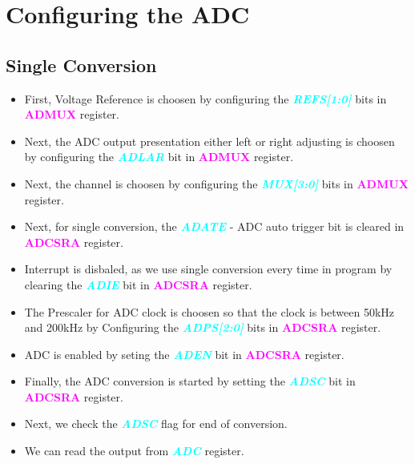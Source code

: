 \documentclass{article}
\newcommand{\bitFormat}[1]{\emph{\textbf{\textcolor{cyan}{#1}}}}
\newcommand{\regFormat}[1]{\textbf{\textcolor{magenta}{#1}}}
\begin{document}
\section{Configuring the ADC}
\subsection{Single Conversion}
\begin{itemize}
    \item First, Voltage Reference is choosen by configuring the \bitFormat{REFS[1:0]} bits in \regFormat{ADMUX} register.
    \item Next, the ADC output presentation either left or right adjusting is choosen by configuring the \bitFormat{ADLAR} bit in \regFormat{ADMUX} register.
    \item Next, the channel is choosen by configuring the \bitFormat{MUX[3:0]} bits in \regFormat{ADMUX} register.
    \item Next, for single conversion, the \bitFormat{ADATE} - ADC auto trigger bit is cleared in \regFormat{ADCSRA} register.
    \item Interrupt is disbaled, as we use single conversion every time in program by clearing the \bitFormat{ADIE} bit in \regFormat{ADCSRA} register.
    \item The Prescaler for ADC clock is choosen so that the clock is  between 50kHz and 200kHz  by Configuring the \bitFormat{ADPS[2:0]} bits in \regFormat{ADCSRA} register.
    \item ADC is enabled by seting the \bitFormat{ADEN} bit in \regFormat{ADCSRA} register.
    \item Finally, the ADC conversion is started by setting the \bitFormat{ADSC} bit in  \regFormat{ADCSRA} register.
    \item Next, we check the \bitFormat{ADSC} flag for end of conversion.
    \item We can read the output from \bitFormat{ADC} register.
\end{itemize}
\end{document}
